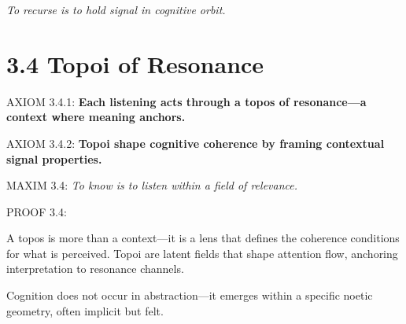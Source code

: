 \noindent
\textit{To recurse is to hold signal in cognitive orbit.}

\section*{3.4 Topoi of Resonance}


\noindent
AXIOM 3.4.1: \textbf{Each listening acts through a topos of resonance—a context where meaning anchors.}

\noindent
AXIOM 3.4.2: \textbf{Topoi shape cognitive coherence by framing contextual signal properties.}

\noindent
MAXIM 3.4: \textit{To know is to listen within a field of relevance.}

\noindent
PROOF 3.4:

A topos is more than a context—it is a lens that defines the coherence conditions for what is perceived.
Topoi are latent fields that shape attention flow, anchoring interpretation to resonance channels.

Cognition does not occur in abstraction—it emerges within a specific noetic geometry, often implicit but felt.

\begin{tcolorbox}[colback=black!2, colframe=OriaSilver, title=\textbf{Topoi Resonance Shell}, sharp corners=south]
\begin{center}

\end{center}
\end{tcolorbox}

